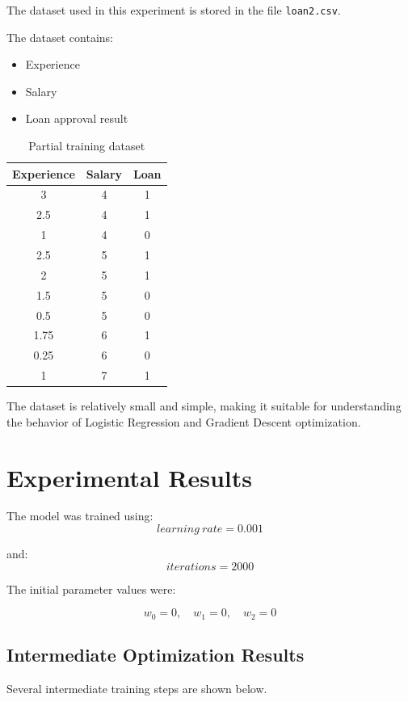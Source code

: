 \documentclass[12pt]{article}
\begin{document}
The dataset used in this experiment is stored in the file \texttt{loan2.csv}.

The dataset contains:
\begin{itemize}
    \item Experience
    \item Salary
    \item Loan approval result
\end{itemize}

\begin{table}[h]
\centering
\begin{tabular}{ccc}
\toprule
Experience & Salary & Loan \\
\midrule
3 & 4 & 1 \\
2.5 & 4 & 1 \\
1 & 4 & 0 \\
2.5 & 5 & 1 \\
2 & 5 & 1 \\
1.5 & 5 & 0 \\
0.5 & 5 & 0 \\
1.75 & 6 & 1 \\
0.25 & 6 & 0 \\
1 & 7 & 1 \\
\bottomrule
\end{tabular}
\caption{Partial training dataset}
\end{table}

The dataset is relatively small and simple, making it suitable for understanding the behavior of Logistic Regression and Gradient Descent optimization.

\section{Experimental Results}

The model was trained using:
\[
learning\ rate = 0.001
\]

and:
\[
iterations = 2000
\]

The initial parameter values were:

\[
w_0 = 0,\quad w_1 = 0,\quad w_2 = 0
\]

\subsection{Intermediate Optimization Results}

Several intermediate training steps are shown below.
\end{document}
